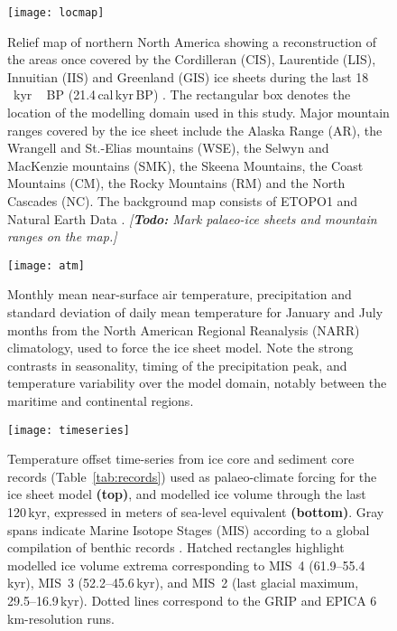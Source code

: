 \documentclass[tc, manuscript]{copernicus}
\newcommand{\todo}[1]{\emph{[\textbf{Todo:} #1]}}
\begin{document}
\begin{figure}
  \texttt{[image: locmap]}
  \caption{Relief map of northern North America showing a reconstruction of the
           areas once covered by the Cordilleran (CIS), Laurentide (LIS),
           Innuitian (IIS) and Greenland (GIS) ice sheets during the last
           18\,\unit{\,kyr\,BP} (21.4\,cal\,kyr\,BP)
           \citep{Dyke.2004}. The rectangular box denotes the location of the
           modelling domain used in this study. Major mountain ranges covered
           by the ice sheet include the Alaska Range (AR), the Wrangell and
           St.-Elias mountains (WSE), the Selwyn and MacKenzie mountains (SMK),
           the Skeena Mountains, the Coast Mountains (CM), the Rocky Mountains
           (RM) and the North Cascades (NC). The background
           map consists of ETOPO1 \citep{Amante.Eakins.2009} and Natural Earth
           Data \citep{Patterson.Kelso.2014}.
           \todo{Mark palaeo-ice sheets and mountain ranges on the map.}}
  \label{fig:locmap}
\end{figure}

\begin{figure}
  \texttt{[image: atm]}
  \caption{Monthly mean near-surface air temperature, precipitation and
           standard deviation of daily mean temperature for January and July
           months from the North American Regional Reanalysis (NARR)
           climatology, used to force the ice sheet model. Note the
           strong contrasts in seasonality, timing of the precipitation peak,
           and temperature variability over the model domain, notably between
           the maritime and continental regions.}
  \label{fig:atm}
\end{figure}

\begin{figure*}
  \texttt{[image: timeseries]}
  \caption{Temperature offset time-series from ice core and sediment core
           records (Table~\ref{tab:records}) used as palaeo-climate forcing for
           the ice sheet model \textbf{(top)}, and modelled ice volume
           through the last 120\,kyr, expressed in meters of sea-level
           equivalent \textbf{(bottom)}. Gray spans indicate Marine Isotope
           Stages (MIS) according to a global compilation of benthic
            records \citep{Lisiecki.Raymo.2005}. Hatched
           rectangles highlight modelled ice volume extrema corresponding to
           MIS~4 (61.9--55.4\,kyr), MIS~3 (52.2--45.6\,kyr), and
           MIS~2 (last glacial maximum, 29.5--16.9\,kyr). Dotted lines
           correspond to the GRIP and EPICA 6\,km-resolution runs.}
  \label{fig:timeseries}
\end{figure*}
\end{document}
